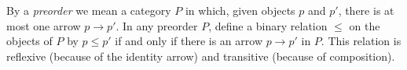 By a \emph{preorder} we mean a category $P$ in which, given objects $p$ and $p'$, there is at most one arrow $p \to p'$. In any preorder $P$, define a binary relation $\leq$ on the objects of $P$ by $p \leq p'$ if and only if there is an arrow $p \to p'$ in $P$. This relation is reflexive (because of the identity arrow) and transitive (because of composition).

